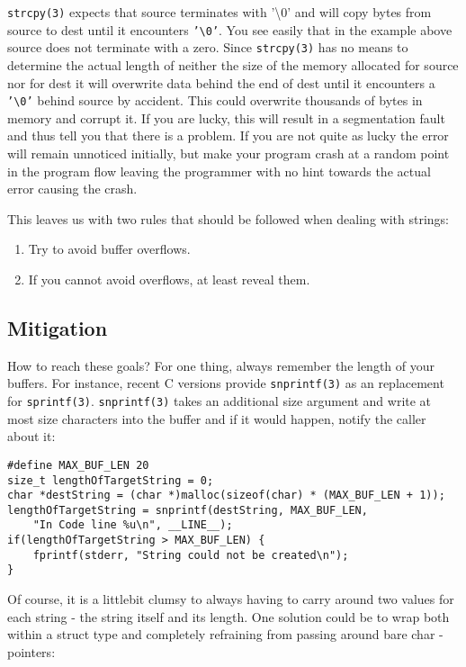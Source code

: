 \texttt{strcpy(3)} expects that source terminates with '\textbackslash0' and 
will copy bytes from source to dest until it encounters 
\texttt{'\textbackslash0'}.
You see easily that in the example above source does not terminate with a zero.
Since \texttt{strcpy(3)} has no means to determine the actual length of neither 
the size of the memory allocated for source nor for dest it will overwrite data 
behind the end of dest until it encounters a \texttt{'\textbackslash0'} behind 
source by accident.
This could overwrite thousands of bytes in memory and corrupt it.
If you are lucky, this will result in a segmentation fault and thus tell you 
that there is a problem. 
If you are not quite as lucky the error will remain unnoticed initially, but
make your program crash at a random point in the program flow leaving the
programmer with no hint towards the actual error causing the crash.

This leaves us with two rules that should be followed when dealing with strings:

\begin{enumerate}
\item Try to avoid buffer overflows.
\item If you cannot avoid overflows, at least reveal them.
\end{enumerate}

\subsection{Mitigation}

How to reach these goals?
For one thing, always remember the length of your buffers.
For instance, recent C versions provide \texttt{snprintf(3)} as an replacement 
for \texttt{sprintf(3)}. \texttt{snprintf(3)} takes an additional size argument
 and write at most size characters into the buffer and if it would happen, 
notify the caller about it:

\begin{lstlisting}
#define MAX_BUF_LEN 20
size_t lengthOfTargetString = 0;
char *destString = (char *)malloc(sizeof(char) * (MAX_BUF_LEN + 1));
lengthOfTargetString = snprintf(destString, MAX_BUF_LEN, 
    "In Code line %u\n", __LINE__);
if(lengthOfTargetString > MAX_BUF_LEN) {
    fprintf(stderr, "String could not be created\n");
}
\end{lstlisting}

Of course, it is a littlebit clumsy to always having to carry around two 
values for each string - the string itself and its length. One solution could be
to wrap both within a struct type and completely refraining from passing around
bare char - pointers:

